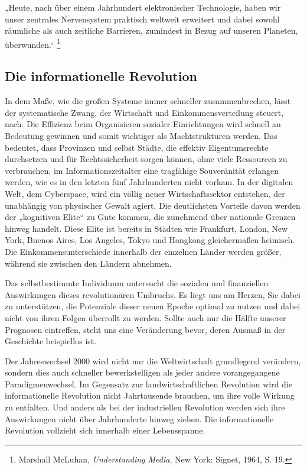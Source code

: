 \documentclass[
  a5paper,
  smalldemyvopaper,10pt,twoside,onecolumn,openright,extrafontsizes,hidelinks]{memoir}
\renewenvironment{quote}%
               {\list{}{\rightmargin=.6cm\leftmargin=.6cm}%
                \itshape \item[]}%
               {\endlist}
\begin{document}
\begin{quote}
„Heute, nach über einem Jahrhundert elektronischer Technologie, haben
wir unser zentrales Nervensystem praktisch weltweit erweitert und dabei
sowohl räumliche als auch zeitliche Barrieren, zumindest in Bezug auf
unseren Planeten, überwunden.`` \footnote{Marshall McLuhan,
  \emph{Understanding Media}, New York: Signet, 1964, S. 19.}
\end{quote}

\subsection{Die informationelle
Revolution}\label{die-informationelle-revolution}

In dem Maße, wie die großen Systeme immer schneller zusammenbrechen,
lässt der systematische Zwang, der Wirtschaft und Einkommensverteilung
steuert, nach. Die Effizienz beim Organisieren sozialer Einrichtungen
wird schnell an Bedeutung gewinnen und somit wichtiger als
Machtstrukturen werden. Das bedeutet, dass Provinzen und selbst Städte,
die effektiv Eigentumsrechte durchsetzen und für Rechtssicherheit sorgen
können, ohne viele Ressourcen zu verbrauchen, im Informationszeitalter
eine tragfähige Souveränität erlangen werden, wie es in den letzten fünf
Jahrhunderten nicht vorkam. In der digitalen Welt, dem Cyberspace, wird
ein völlig neuer Wirtschaftssektor entstehen, der unabhängig von
physischer Gewalt agiert. Die deutlichsten Vorteile davon werden der
„kognitiven Elite`` zu Gute kommen, die zunehmend über nationale Grenzen
hinweg handelt. Diese Elite ist bereits in Städten wie Frankfurt,
London, New York, Buenos Aires, Los Angeles, Tokyo und Hongkong
gleichermaßen heimisch. Die Einkommensunterschiede innerhalb der
einzelnen Länder werden größer, während sie zwischen den Ländern
abnehmen.

Das selbstbestimmte Individuum untersucht die sozialen und finanziellen
Auswirkungen dieses revolutionären Umbruchs. Es liegt uns am Herzen, Sie
dabei zu unterstützen, die Potenziale dieser neuen Epoche optimal zu
nutzen und dabei nicht von ihren Folgen überrollt zu werden. Sollte auch
nur die Hälfte unserer Prognosen eintreffen, steht uns eine Veränderung
bevor, deren Ausmaß in der Geschichte beispiellos ist.

Der Jahreswechsel 2000 wird nicht nur die Weltwirtschaft grundlegend
verändern, sondern dies auch schneller bewerkstelligen als jeder andere
vorangegangene Paradigmenwechsel. Im Gegensatz zur landwirtschaftlichen
Revolution wird die informationelle Revolution nicht Jahrtausende
brauchen, um ihre volle Wirkung zu entfalten. Und anders als bei der
industriellen Revolution werden sich ihre Auswirkungen nicht über
Jahrhunderte hinweg ziehen. Die informationelle Revolution vollzieht
sich innerhalb einer Lebensspanne.
\end{document}
